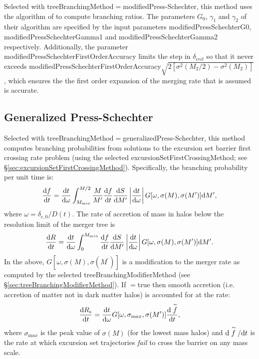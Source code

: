 Selected with {\normalfont \ttfamily treeBranchingMethod}$=${\normalfont \ttfamily modifiedPress-Schechter}, this method uses the algorithm of \cite{parkinson_generating_2008} to compute branching ratios. The parameters $G_0$, $\gamma_1$ and $\gamma_2$ of their algorithm are specified by the input parameters {\normalfont \ttfamily modifiedPressSchechterG0}, {\normalfont \ttfamily modifiedPressSchechterGamma1} and {\normalfont \ttfamily modifiedPressSchechterGamma2} respectively. Additionally, the parameter {\normalfont \ttfamily modifiedPressSchechterFirstOrderAccuracy} limits the step in $\delta_{\mathrm crit}$ so that it never exceeds {\normalfont \ttfamily modifiedPressSchechterFirstOrderAccuracy}$\sqrt{2[\sigma^2(M_2/2)-\sigma^2(M_2)]}$, which ensures the the first order expansion of the merging rate that is assumed is accurate.

\subsection{Generalized Press-Schechter}

Selected with {\normalfont \ttfamily treeBranchingMethod}$=${\normalfont \ttfamily generalizedPress-Schechter}, this method computes branching probabilities from solutions to the excursion set barrier first crossing rate problem (using the selected {\normalfont \ttfamily excursionSetFirstCrossingMethod}; see \S\ref{sec:excursionSetFirstCrossingMethod}). Specifically, the branching probability per unit time is:
\begin{equation}
 {\d f \over \d t} = {{\mathrm d} t \over {\mathrm d}\omega} \int_{M_{\mathrm min}}^{M/2} {M \over M^\prime} {\d f \over \d t} {\d S \over \d M^\prime} \left| {\d t \over \d \omega}\right| G[\omega,\sigma(M),\sigma(M^\prime)] \d M^\prime,
\end{equation}
where $\omega = \delta_{\mathrm c,0}/D(t)$. The rate of accretion of mass in halos below the resolution limit of the merger tree is
\begin{equation}
 {\d R \over \d t} =  {{\mathrm d} t \over {\mathrm d}\omega} \int_0^{M_{\mathrm min}} {\d f \over \d t} {\d S \over \d M^\prime} \left| {\d t \over \d \omega}\right| G[\omega,\sigma(M),\sigma(M^\prime)] \d M^\prime.
\end{equation}
In the above, $G[\omega,\sigma(M),\sigma(M^\prime)]$ is a modification to the merger rate as computed by the selected {\normalfont \ttfamily treeBranchingModifierMethod} (see \S\ref{sec:treeBranchingModifierMethod}). If {\normalfont \ttfamily [generalizedPressSchechterSmoothAccretion]}$=${\normalfont \ttfamily true} then smooth accretion (i.e. accretion of matter not in dark matter halos) is accounted for at the rate:
\begin{equation}
 {\d R_{\mathrm s} \over \d t} =  {{\mathrm d} t \over {\mathrm d}\omega} G[\omega,\sigma_{\mathrm max},\sigma(M^\prime)] {\d \stackrel{\sim}{f} \over \d t},
\end{equation}
where $\sigma_{\mathrm max}$ is the peak value of $\sigma(M)$ (for the lowest mass halos) and $\d \stackrel{\sim}{f}/\d t$ is the rate at which excursion set trajectories \emph{fail} to cross the barrier on any mass scale.


